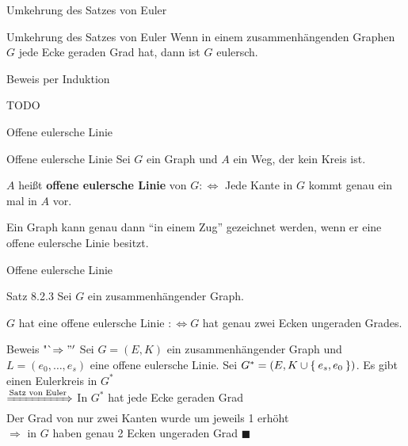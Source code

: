 \begin{frame}{Umkehrung des Satzes von Euler}
\begin{block}{Umkehrung des Satzes von Euler}
Wenn in einem zusammenhängenden Graphen $G$ jede Ecke geraden Grad hat, dann 
ist $G$ eulersch.
\end{block}

Beweis per Induktion

TODO
\end{frame}

\begin{frame}{Offene eulersche Linie}
\begin{block}{Offene eulersche Linie}
Sei $G$ ein Graph und $A$ ein Weg, der kein Kreis ist.

$A$ heißt \textbf{offene eulersche Linie} von $G :\Leftrightarrow$ Jede Kante in $G$ kommt genau ein mal in $A$ vor.
\end{block}

Ein Graph kann genau dann "`in einem Zug"' gezeichnet werden, wenn er eine 
offene eulersche Linie besitzt.
\end{frame}

\begin{frame}{Offene eulersche Linie}
\begin{block}{Satz 8.2.3}
Sei $G$ ein zusammenhängender Graph.

$G$ hat eine offene eulersche Linie $:\Leftrightarrow G$ hat genau zwei Ecken 
ungeraden Grades.
\end{block}

\pause

\begin{block}{Beweis "`$\Rightarrow"'$}
Sei $G=(E, K)$ ein zusammenhängender Graph und $L = (e_0, \dots, e_s)$ eine offene
eulersche Linie. \pause
Sei $G^* = (E, K \cup \Set{e_s, e_0})$. \pause
Es gibt einen Eulerkreis in $G^*$ \pause \\
$\xRightarrow{\text{Satz von Euler}}$ In $G^*$ hat jede Ecke geraden Grad \pause \\
Der Grad von nur zwei Kanten wurde um jeweils 1 erhöht \pause \\
$\Rightarrow$ in $G$ haben genau 2 Ecken ungeraden Grad $\blacksquare$
\end{block}
\end{frame}

